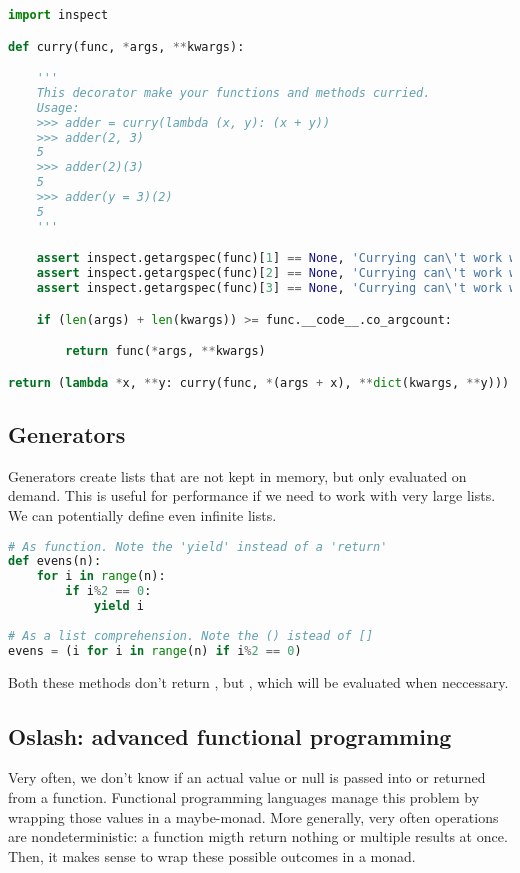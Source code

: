 \begin{lstlisting}[language=python]
import inspect

def curry(func, *args, **kwargs):

    '''
    This decorator make your functions and methods curried.
    Usage:
    >>> adder = curry(lambda (x, y): (x + y))
    >>> adder(2, 3)
    5
    >>> adder(2)(3)
    5
    >>> adder(y = 3)(2)
    5
    '''

    assert inspect.getargspec(func)[1] == None, 'Currying can\'t work with *args syntax'
    assert inspect.getargspec(func)[2] == None, 'Currying can\'t work with *kwargs syntax'
    assert inspect.getargspec(func)[3] == None, 'Currying can\'t work with default arguments'

    if (len(args) + len(kwargs)) >= func.__code__.co_argcount:

        return func(*args, **kwargs)

return (lambda *x, **y: curry(func, *(args + x), **dict(kwargs, **y)))
\end{lstlisting}

\subsection{Generators}

Generators create lists that are not kept in memory, but only evaluated on demand. This is useful for performance if we need to work with very large lists. We can potentially define even infinite lists. 

\begin{lstlisting}[language=python]
# As function. Note the 'yield' instead of a 'return'
def evens(n):
    for i in range(n):
        if i%2 == 0:
            yield i
            
# As a list comprehension. Note the () istead of []
evens = (i for i in range(n) if i%2 == 0)
\end{lstlisting}

Both these methods don't return \inlinecode{[1, 2, 4, ..., n**2]}, but , which will be evaluated when neccessary.


\subsection{Oslash: advanced functional programming}

Very often, we don't know if an actual value or null is passed into or returned from a function. Functional programming languages manage this problem by wrapping those values in a maybe-monad. More generally, very often operations are nondeterministic: a function migth return nothing or multiple results at once. Then, it makes sense to wrap these possible outcomes in a monad. 


